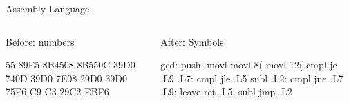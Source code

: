 \documentclass{plt}
\begin{document}
\begin{frame}[fragile]{Assembly Language}

  \begin{columns}
    \begin{column}[t]{0.3\textwidth}

      \alert{Before: numbers}

      \medskip

\begin{shadedverbatim}
55    
89E5  
8B4508
8B550C
39D0  
740D
39D0  
7E08  
29D0  
39D0  
75F6  
C9    
C3    
29C2  
EBF6
\end{shadedverbatim}   
    
    \end{column}
    \begin{column}[t]{0.6\textwidth}

      \alert{After: Symbols}

      \medskip

\begin{shadedverbatim}
gcd: pushl %
     movl  %
     movl  8(%
     movl  12(%
     cmpl  %
     je    .L9
.L7: cmpl  %
     jle   .L5
     subl  %
.L2: cmpl  %
     jne   .L7
.L9: leave
     ret
.L5: subl  %
     jmp   .L2
\end{shadedverbatim}

    \end{column}
  \end{columns}

\end{frame}
\end{document}
